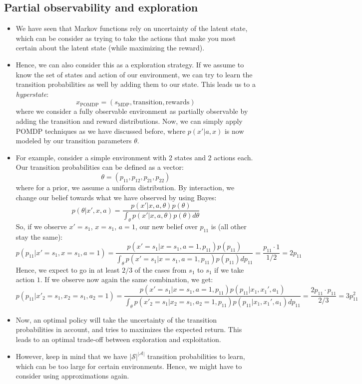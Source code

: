\subsection{Partial observability and exploration}
\begin{itemize}
	\item We have seen that Markov functions rely on uncertainty of the latent state, which can be consider as trying to take the actions that make you most certain about the latent state (while maximizing the reward).
	\item Hence, we can also consider this as a exploration strategy. If we assume to know the set of states and action of our environment, we can try to learn the transition probabilities as well by adding them to our state. This leads us to a \textit{hyperstate}:
	$$x_{\text{POMDP}} = (s_{\text{MDP}}, \text{transition}, \text{rewards})$$
	where we consider a fully observable environment as partially observable by adding the transition and reward distributions. Now, we can simply apply POMDP techniques as we have discussed before, where $p(x'|a,x)$ is now modeled by our transition parameters $\theta$.
	\item For example, consider a simple environment with 2 states and 2 actions each. Our transition probabilities can be defined as a vector:
	$$\theta=(p_{11},p_{12},p_{21},p_{22})$$
	where for a prior, we assume a uniform distribution. By interaction, we change our belief towards what we have observed by using Bayes:
	$$p(\theta | x',x,a) = \frac{p(x'|x,a,\theta)p(\theta)}{\int_{\theta} p(x'|x,a,\theta)p(\theta)d\theta}$$
	So, if we observe $x'=s_1$, $x=s_1$, $a=1$, our new belief over $p_{11}$ is (all other stay the same):
	$$p(p_{11}|x'=s_1,x=s_1,a=1)=\frac{p(x'=s_1|x=s_1,a=1,p_{11})p(p_{11})}{\int_{\theta} p(x'=s_1|x=s_1,a=1,p_{11})p(p_{11})dp_{11}} = \frac{p_{11} \cdot 1}{1/2} = 2p_{11}$$
	Hence, we expect to go in at least $2/3$ of the cases from $s_1$ to $s_1$ if we take action $1$. If we observe now again the same combination, we get:
	$$p(p_{11}|x'_2=s_1,x_2=s_1,a_2=1)=\frac{p(x'=s_1|x=s_1,a=1,p_{11})p(p_{11}|x_1,x_1',a_1)}{\int_{\theta} p(x'_2=s_1|x_2=s_1,a_2=1,p_{11})p(p_{11}|x_1,x_1',a_1)dp_{11}} = \frac{2p_{11} \cdot p_{11}}{2/3} = 3p_{11}^2$$
	\item Now, an optimal policy will take the uncertainty of the transition probabilities in account, and tries to maximizes the expected return. This leads to an optimal trade-off between exploration and exploitation.
	\item However, keep in mind that we have $|\mathcal{S}|^{|\mathcal{A}|}$ transition probabilities to learn, which can be too large for certain environments. Hence, we might have to consider using approximations again.
\end{itemize}
